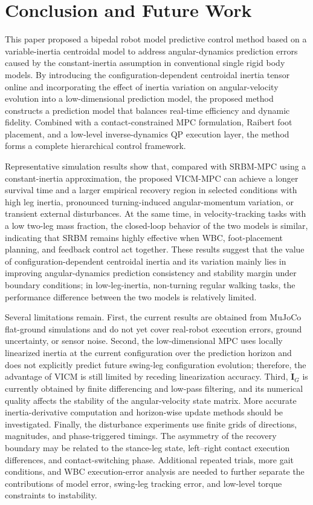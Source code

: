 \documentclass[5p,times]{elsarticle}
\begin{document}
\section{Conclusion and Future Work}
This paper proposed a bipedal robot model predictive control method based on a variable-inertia centroidal model to address angular-dynamics prediction errors caused by the constant-inertia assumption in conventional single rigid body models. By introducing the configuration-dependent centroidal inertia tensor online and incorporating the effect of inertia variation on angular-velocity evolution into a low-dimensional prediction model, the proposed method constructs a prediction model that balances real-time efficiency and dynamic fidelity. Combined with a contact-constrained MPC formulation, Raibert foot placement, and a low-level inverse-dynamics QP execution layer, the method forms a complete hierarchical control framework.

Representative simulation results show that, compared with SRBM-MPC using a constant-inertia approximation, the proposed VICM-MPC can achieve a longer survival time and a larger empirical recovery region in selected conditions with high leg inertia, pronounced turning-induced angular-momentum variation, or transient external disturbances. At the same time, in velocity-tracking tasks with a low two-leg mass fraction, the closed-loop behavior of the two models is similar, indicating that SRBM remains highly effective when WBC, foot-placement planning, and feedback control act together. These results suggest that the value of configuration-dependent centroidal inertia and its variation mainly lies in improving angular-dynamics prediction consistency and stability margin under boundary conditions; in low-leg-inertia, non-turning regular walking tasks, the performance difference between the two models is relatively limited.

Several limitations remain. First, the current results are obtained from MuJoCo flat-ground simulations and do not yet cover real-robot execution errors, ground uncertainty, or sensor noise. Second, the low-dimensional MPC uses locally linearized inertia at the current configuration over the prediction horizon and does not explicitly predict future swing-leg configuration evolution; therefore, the advantage of VICM is still limited by receding linearization accuracy. Third, $\dot{\bm I}_G$ is currently obtained by finite differencing and low-pass filtering, and its numerical quality affects the stability of the angular-velocity state matrix. More accurate inertia-derivative computation and horizon-wise update methods should be investigated. Finally, the disturbance experiments use finite grids of directions, magnitudes, and phase-triggered timings. The asymmetry of the recovery boundary may be related to the stance-leg state, left--right contact execution differences, and contact-switching phase. Additional repeated trials, more gait conditions, and WBC execution-error analysis are needed to further separate the contributions of model error, swing-leg tracking error, and low-level torque constraints to instability.
\end{document}
